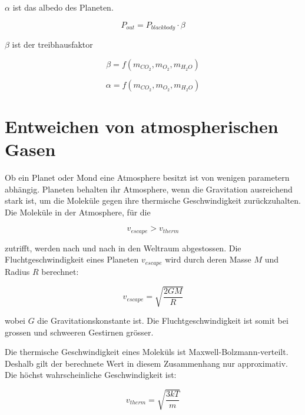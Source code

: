 \begin{refsection}
$\alpha$ ist das albedo des Planeten.

\begin{equation}
P_{out} = P_{blackbody} \cdot \beta
\end{equation}

$\beta$ ist der treibhausfaktor

\begin{equation}
\beta = f(m_{CO_2}, m_{O_2}, m_{H_2O})
\end{equation}

\begin{equation}
\alpha = f(m_{CO_2}, m_{O_2}, m_{H_2O})
\end{equation}



\section{Entweichen von atmospherischen Gasen}

Ob ein Planet oder Mond eine Atmosphere besitzt ist von wenigen parametern abhängig. Planeten behalten ihr Atmosphere, wenn die Gravitation ausreichend stark ist, um die Moleküle gegen ihre thermische Geschwindigkeit zurückzuhalten.
Die Moleküle in der Atmosphere, für die


\begin{equation}
v_{escape} > v_{therm}
\end{equation}

zutrifft, werden nach und nach in den Weltraum abgestossen.
Die Fluchtgeschwindigkeit eines Planeten $v_{escape}$ wird durch deren Masse $M$ und Radius $R$ berechnet: 

\begin{equation}
v_{escape} = \sqrt{\frac{2GM}{R}}
\end{equation}

wobei $G$ die Gravitationskonstante ist. Die Fluchtgeschwindigkeit ist somit bei grossen und schweeren Gestirnen grösser.

Die thermische Geschwindigkeit eines Moleküls ist Maxwell-Bolzmann-verteilt. Deshalb gilt der berechnete Wert in diesem Zusammenhang nur approximativ. Die höchst wahrscheinliche Geschwindigkeit ist: 

\begin{equation}
v_{therm} = \sqrt{\frac{3kT}{m}}
\end{equation}


\end{refsection}
